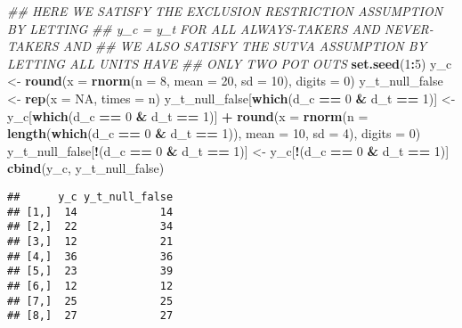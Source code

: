 \documentclass[12pt,leqno]{article}
\newenvironment{Shaded}{\begin{snugshade}}{\end{snugshade}}
\newcommand{\CommentTok}[1]{\textcolor[rgb]{0.56,0.35,0.01}{\textit{#1}}}
\newcommand{\DataTypeTok}[1]{\textcolor[rgb]{0.13,0.29,0.53}{#1}}
\newcommand{\DecValTok}[1]{\textcolor[rgb]{0.00,0.00,0.81}{#1}}
\newcommand{\KeywordTok}[1]{\textcolor[rgb]{0.13,0.29,0.53}{\textbf{#1}}}
\newcommand{\NormalTok}[1]{#1}
\newcommand{\OperatorTok}[1]{\textcolor[rgb]{0.81,0.36,0.00}{\textbf{#1}}}
\newcommand{\OtherTok}[1]{\textcolor[rgb]{0.56,0.35,0.01}{#1}}
\newcommand{\StringTok}[1]{\textcolor[rgb]{0.31,0.60,0.02}{#1}}
\theoremstyle{newstyle}
\begin{document}
\begin{Shaded}
\begin{Highlighting}[]
\CommentTok{\#\# HERE WE SATISFY THE EXCLUSION RESTRICTION ASSUMPTION BY LETTING}
\CommentTok{\#\# y\_c = y\_t FOR ALL ALWAYS{-}TAKERS AND NEVER{-}TAKERS AND}
\CommentTok{\#\# WE ALSO SATISFY THE SUTVA ASSUMPTION BY LETTING ALL UNITS HAVE}
\CommentTok{\#\# ONLY TWO POT OUTS}
\KeywordTok{set.seed}\NormalTok{(}\DecValTok{1}\OperatorTok{:}\DecValTok{5}\NormalTok{)}
\NormalTok{y\_c \textless{}{-}}\StringTok{ }\KeywordTok{round}\NormalTok{(}\DataTypeTok{x =} \KeywordTok{rnorm}\NormalTok{(}\DataTypeTok{n =} \DecValTok{8}\NormalTok{, }\DataTypeTok{mean =} \DecValTok{20}\NormalTok{, }\DataTypeTok{sd =} \DecValTok{10}\NormalTok{), }\DataTypeTok{digits =} \DecValTok{0}\NormalTok{)}
\NormalTok{y\_t\_null\_false \textless{}{-}}\StringTok{ }\KeywordTok{rep}\NormalTok{(}\DataTypeTok{x =} \OtherTok{NA}\NormalTok{, }\DataTypeTok{times =}\NormalTok{ n)}
\NormalTok{y\_t\_null\_false[}\KeywordTok{which}\NormalTok{(d\_c }\OperatorTok{==}\StringTok{ }\DecValTok{0} \OperatorTok{\&}\StringTok{ }\NormalTok{d\_t }\OperatorTok{==}\StringTok{ }\DecValTok{1}\NormalTok{)] \textless{}{-}}\StringTok{ }\NormalTok{y\_c[}\KeywordTok{which}\NormalTok{(d\_c }\OperatorTok{==}\StringTok{ }\DecValTok{0} \OperatorTok{\&}\StringTok{ }\NormalTok{d\_t }\OperatorTok{==}\StringTok{ }\DecValTok{1}\NormalTok{)] }\OperatorTok{+}
\StringTok{  }\KeywordTok{round}\NormalTok{(}\DataTypeTok{x =} \KeywordTok{rnorm}\NormalTok{(}\DataTypeTok{n =} \KeywordTok{length}\NormalTok{(}\KeywordTok{which}\NormalTok{(d\_c }\OperatorTok{==}\StringTok{ }\DecValTok{0} \OperatorTok{\&}\StringTok{ }\NormalTok{d\_t }\OperatorTok{==}\StringTok{ }\DecValTok{1}\NormalTok{)),}
                  \DataTypeTok{mean =} \DecValTok{10}\NormalTok{,}
                  \DataTypeTok{sd =} \DecValTok{4}\NormalTok{),}
        \DataTypeTok{digits =} \DecValTok{0}\NormalTok{)}
\NormalTok{y\_t\_null\_false[}\OperatorTok{!}\NormalTok{(d\_c }\OperatorTok{==}\StringTok{ }\DecValTok{0} \OperatorTok{\&}\StringTok{ }\NormalTok{d\_t }\OperatorTok{==}\StringTok{ }\DecValTok{1}\NormalTok{)] \textless{}{-}}\StringTok{ }\NormalTok{y\_c[}\OperatorTok{!}\NormalTok{(d\_c }\OperatorTok{==}\StringTok{ }\DecValTok{0} \OperatorTok{\&}\StringTok{ }\NormalTok{d\_t }\OperatorTok{==}\StringTok{ }\DecValTok{1}\NormalTok{)]}
\KeywordTok{cbind}\NormalTok{(y\_c, y\_t\_null\_false)}
\end{Highlighting}
\end{Shaded}

\begin{verbatim}
##      y_c y_t_null_false
## [1,]  14             14
## [2,]  22             34
## [3,]  12             21
## [4,]  36             36
## [5,]  23             39
## [6,]  12             12
## [7,]  25             25
## [8,]  27             27
\end{verbatim}
\end{document}
